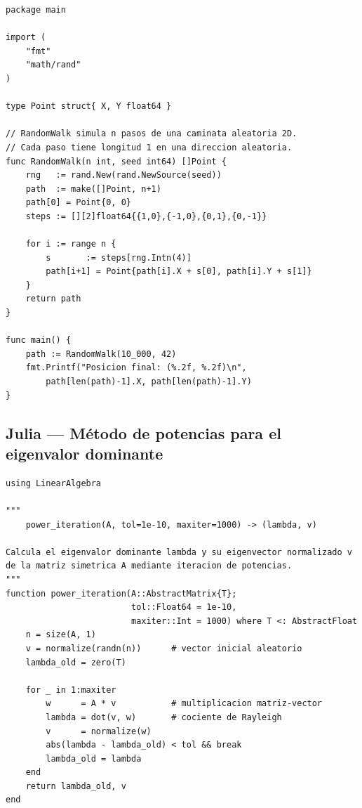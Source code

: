 \begin{lstlisting}[style=go,
  caption={Simulación de caminata aleatoria 2D en Go},
  label={lst:rw-go}]
package main

import (
    "fmt"
    "math/rand"
)

type Point struct{ X, Y float64 }

// RandomWalk simula n pasos de una caminata aleatoria 2D.
// Cada paso tiene longitud 1 en una direccion aleatoria.
func RandomWalk(n int, seed int64) []Point {
    rng   := rand.New(rand.NewSource(seed))
    path  := make([]Point, n+1)
    path[0] = Point{0, 0}
    steps := [][2]float64{{1,0},{-1,0},{0,1},{0,-1}}

    for i := range n {
        s       := steps[rng.Intn(4)]
        path[i+1] = Point{path[i].X + s[0], path[i].Y + s[1]}
    }
    return path
}

func main() {
    path := RandomWalk(10_000, 42)
    fmt.Printf("Posicion final: (%.2f, %.2f)\n",
        path[len(path)-1].X, path[len(path)-1].Y)
}
\end{lstlisting}

\subsection{Julia — Método de potencias para el eigenvalor dominante}
\label{subsec:julia}

\begin{lstlisting}[style=julia,
  caption={Iteración de potencias: eigenvalor dominante de $\eqten{A}$},
  label={lst:power-julia}]
using LinearAlgebra

"""
    power_iteration(A, tol=1e-10, maxiter=1000) -> (lambda, v)

Calcula el eigenvalor dominante lambda y su eigenvector normalizado v
de la matriz simetrica A mediante iteracion de potencias.
"""
function power_iteration(A::AbstractMatrix{T};
                         tol::Float64 = 1e-10,
                         maxiter::Int = 1000) where T <: AbstractFloat
    n = size(A, 1)
    v = normalize(randn(n))      # vector inicial aleatorio
    lambda_old = zero(T)

    for _ in 1:maxiter
        w      = A * v           # multiplicacion matriz-vector
        lambda = dot(v, w)       # cociente de Rayleigh
        v      = normalize(w)
        abs(lambda - lambda_old) < tol && break
        lambda_old = lambda
    end
    return lambda_old, v
end
\end{lstlisting}

